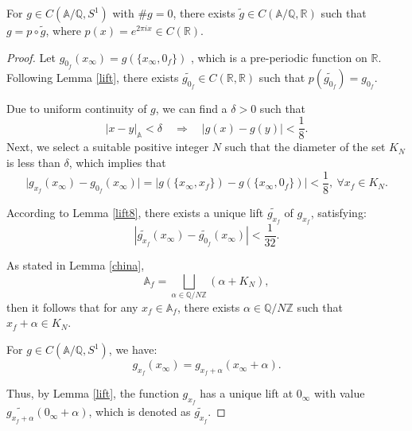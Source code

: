 \documentclass[10pt,a4paper]{amsart}
\newcommand{\A}{\mathbb{A}}
\begin{document}
\begin{lemma}\label{adelelift}
     For \( g \in C(\A/\mathbb{Q}, S^1) \) with \( \#g = 0 \), there exists \( \tilde{g} \in C(\A/\mathbb{Q}, \mathbb{R}) \) such that \( g = p \circ \tilde{g} \), where \(p(x)=e^{2\pi ix}\in C(\mathbb{R}).\)
\end{lemma}

\begin{proof}
    Let \( g_{0_f}(x_\infty) = g(\{x_{\infty}, 0_f\}) \) , which is a pre-periodic function on \( \mathbb{R} \). Following Lemma \ref{lift}, there exists \( \widetilde{g_{0_f}} \in C(\mathbb{R}, \mathbb{R}) \) such that \( p(\widetilde{g_{0_f}}) = g_{0_f} \).

Due to uniform continuity of $g$, we can find a $\delta > 0$ such that 
\[
|x - y|_{\A} < \delta \quad \Rightarrow \quad |g(x) - g(y)| < \frac{1}{8}.
\]
 Next, we select a suitable positive integer \( N \) such that the diameter of the set $K_N$ is less than $\delta$, which implies that
\[
\lvert g_{x_f}(x_\infty) - g_{0_f}(x_\infty)\rvert= \lvert g(\{x_{\infty}, x_f\}) - g(\{x_{\infty}, 0_f\})\rvert < \frac{1}{8},\ \forall x_f\in K_N.
\]

According to Lemma \ref{lift8}, there exists a unique lift \(\widetilde{g_{x_f}}\) of \( g_{x_f} \), satisfying:
\[
|\widetilde{g_{x_f}}(x_\infty) - \widetilde{g_{0_f}}(x_\infty)| < \frac{1}{32}.
\]

As stated in Lemma \ref{china},
\[
\A_f = \bigsqcup_{\alpha\in \mathbb{Q}/N\mathbb{Z}} \left( \alpha + K_N\right),
\]
then it follows that for any \( x_f \in \A_f \), there exists \( \alpha \in \mathbb{Q}/N\mathbb{Z} \) such that \( x_f + \alpha \in K_N \). 

For \( g \in C(\mathbb{A}/\mathbb{Q},S^1) \), we have:
\[
g_{x_f}(x_\infty) = g_{x_f + \alpha}(x_\infty+\alpha).
\]

Thus, by Lemma \ref{lift}, the function \( g_{x_f} \) has a unique lift at \( 0_{\infty} \) with value \( \widetilde{g_{x_f + \alpha}}(0_\infty+\alpha) \), which is denoted as \( \widetilde{g_{x_f}} \).


\end{proof}
\end{document}
